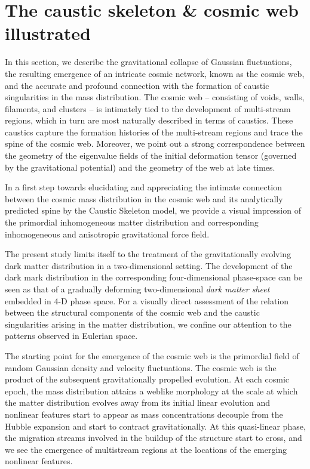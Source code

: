 \documentclass[a4paper, 11pt]{article}
\begin{document}
\section{The caustic skeleton \& cosmic web illustrated}
\label{sec:Eulerian_space}
In this section, we describe the gravitational collapse of Gaussian fluctuations, the resulting emergence of an intricate cosmic network, known as the cosmic web, and the accurate and profound connection with the formation of caustic singularities in the mass distribution. The cosmic web -- consisting of voids, walls, filaments, and clusters -- is intimately tied to the development of multi-stream regions, which in turn are most naturally described in terms of caustics. These caustics capture the formation histories of the multi-stream regions and trace the spine of the cosmic web. Moreover, we point out a strong correspondence between the geometry of the eigenvalue fields of the initial deformation tensor (governed by the gravitational potential) and the geometry of the web at late times. 

In a first step towards elucidating and appreciating the intimate connection between the cosmic mass distribution in the cosmic web and its analytically predicted spine by the Caustic Skeleton model, we provide a visual impression of the primordial inhomogeneous matter distribution and corresponding inhomogeneous and anisotropic gravitational force field.

The present study limits itself to the treatment of the gravitationally evolving dark matter distribution in a two-dimensional setting. The development of the dark mark distribution in the corresponding four-dimensional phase-space can be seen as that of a gradually deforming two-dimensional {\it dark matter sheet} embedded in 4-D phase space. For a visually direct assessment of the relation between the structural components of the cosmic web and the caustic singularities arising in the matter distribution, we confine our attention to the patterns observed in Eulerian space. 

The starting point for the emergence of the cosmic web is the primordial field of random Gaussian density and velocity fluctuations. The cosmic web is the product of the subsequent gravitationally propelled evolution. At each cosmic epoch, the mass distribution attains a weblike morphology at the scale at which the matter distribution evolves away from its initial linear evolution and nonlinear features start to appear as mass concentrations decouple from the Hubble expansion and start to contract gravitationally. At this quasi-linear phase, the migration streams involved in the buildup of the structure start to cross, and we see the emergence of multistream regions at the locations of the emerging nonlinear features. 
\end{document}
